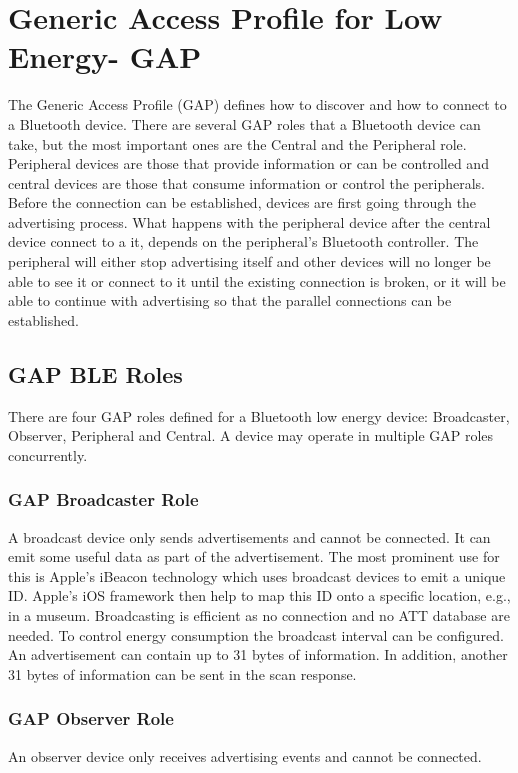 \documentclass[a4paper,titlepage,oneside,12pt]{amsart} %
\begin{document}
\pagebreak

\section{Generic Access Profile for Low Energy- GAP}
The Generic Access Profile (GAP) defines how to discover and how to connect to a Bluetooth device. There are several GAP roles that a Bluetooth device can take, but the most important ones are the Central and the Peripheral role. Peripheral devices are those that provide information or can be controlled and central devices are those that consume information or control the peripherals. Before the connection can be established, devices are first going through the advertising process. What happens with the peripheral device after the central device connect to a it, depends on the peripheral's Bluetooth controller. The peripheral will either stop advertising itself and other devices will no longer be able to see it or connect to it until the existing connection is broken, or it will be able to continue with advertising so that the parallel connections can be established.

\subsection{GAP BLE Roles}
There are four GAP roles defined for a Bluetooth low energy device: Broadcaster, Observer, Peripheral and Central. A device may operate in multiple GAP roles concurrently.

\subsubsection{GAP Broadcaster Role}
A broadcast device only sends advertisements and cannot be connected. It can emit some useful data as part of the advertisement. The most prominent use for this is Apple's iBeacon technology which uses broadcast devices to emit a unique ID. Apple's iOS framework then help to map this ID onto a specific location, e.g., in a museum.
Broadcasting is efficient as no connection and no ATT database are needed. To control energy consumption the broadcast interval can be configured. An advertisement can contain up to 31 bytes of information. In addition, another 31 bytes of information can be sent in the scan response.

\subsubsection{GAP Observer Role}
An observer device only receives advertising events and cannot be connected. 
\end{document}
